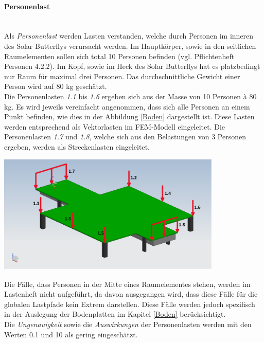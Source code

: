 \paragraph{Personenlast}\mbox{}\\
Als \emph{Personenlast} werden Lasten verstanden, welche durch Personen im inneren des Solar Butterflys verursacht werden. Im Hauptkörper, sowie in den seitlichen Raumelementen sollen sich total 10 Personen befinden (vgl. Pflichtenheft Personen 4.2.2). Im Kopf, sowie im Heck des Solar Butterflys hat es platzbedingt nur Raum für maximal drei Personen. Das durchschnittliche Gewicht einer Person wird auf 80 kg geschätzt.\\
Die Personenlasten \emph{1.1} bis \emph{1.6} ergeben sich aus der Masse von 10 Personen à 80 kg. Es wird jeweils vereinfacht angenommen, dass sich alle Personen an einem Punkt befinden, wie dies in der Abbildung \ref{Boden} dargestellt ist. Diese Lasten werden entsprechend als Vektorlasten im FEM-Modell eingeleitet. Die Personenlasten \emph{1.7} und \emph{1.8}, welche sich aus den Belastungen von 3 Personen ergeben, werden als Streckenlasten eingeleitet.

\begin{center}
  \includegraphics[width=0.8\textwidth]{04_Figures/BodenMitLasten.png}
  \label{Boden}
\end{center}

Die Fälle, dass Personen in der Mitte eines Raumelementes stehen, werden im Lastenheft nicht aufgeführt, da davon ausgegangen wird, dass diese Fälle für die globalen Lastpfade kein Extrem darstellen. Diese Fälle werden jedoch spezifisch in der Auslegung der Bodenplatten im Kapitel \ref{Boden} berücksichtigt.\\
Die \emph{Ungenauigkeit} sowie die \emph{Auswirkungen} der Personenlasten werden mit den Werten 0.1 und 10 als gering eingeschätzt.

